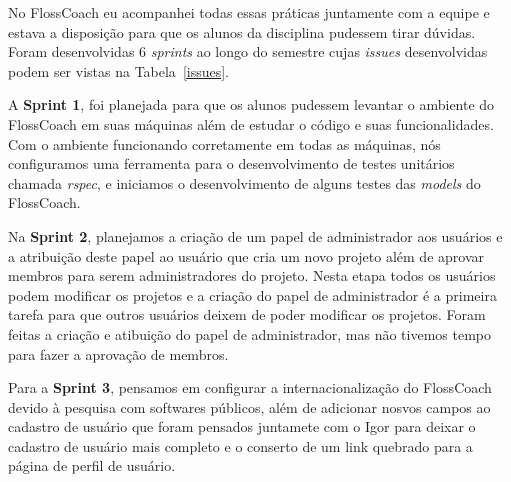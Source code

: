 No FlossCoach eu acompanhei todas essas práticas juntamente com a equipe e estava
a disposição para que os alunos da disciplina pudessem tirar dúvidas. Foram desenvolvidas
6 \textit{sprints} ao longo do semestre cujas \textit{issues} desenvolvidas podem
ser vistas na Tabela~\ref{issues}.

A \textbf{Sprint 1}, foi planejada para que os alunos pudessem levantar o ambiente
do FlossCoach em suas máquinas além de estudar o código e suas funcionalidades. Com o
ambiente funcionando corretamente em todas as máquinas, nós configuramos uma ferramenta
para o desenvolvimento de testes unitários chamada \textit{rspec}, e iniciamos o 
desenvolvimento de alguns testes das \textit{models} do FlossCoach. 

Na \textbf{Sprint 2}, planejamos a criação de um papel de administrador aos usuários
e a atribuição deste papel ao usuário que cria um novo projeto além de aprovar 
membros para serem administradores do projeto. Nesta etapa todos os usuários podem
modificar os projetos e a criação do papel de administrador é a primeira tarefa 
para que outros usuários deixem de poder modificar os projetos. Foram feitas a 
criação e atibuição do papel de administrador, mas não tivemos tempo para fazer a 
aprovação de membros.

Para a \textbf{Sprint 3}, pensamos em configurar a internacionalização do FlossCoach
devido à pesquisa com softwares públicos, além de adicionar nosvos campos ao cadastro 
de usuário que foram pensados juntamete com o Igor para deixar o cadastro de usuário 
mais completo e o conserto de um link quebrado para a página de perfil de usuário.  


